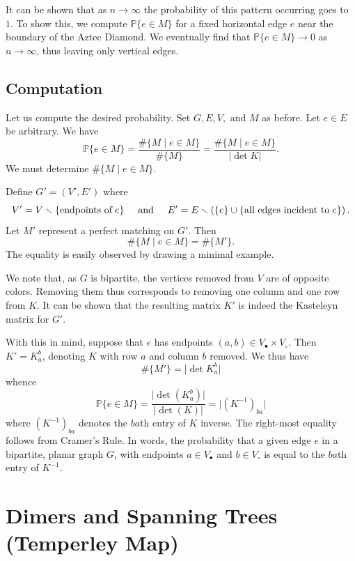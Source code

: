 \documentclass{article}
\begin{document}
It can be shown that as $n \rightarrow \infty$ the probability of this pattern occurring goes to $1$. To show this, we compute
$
\mathbb{P} \{ e \in M\}
$
for a fixed horizontal edge $e$ near the boundary of the Aztec Diamond. We eventually find that $\mathbb{P} \{ e \in M\} \rightarrow 0$ as $n \rightarrow \infty$, thus leaving only vertical edges. 

\subsection{Computation}

\hspace{1cm} Let us compute the desired probability. Set $G,E,V,$ and $M$ as before. Let $e \in E$ be arbitrary. We have
$$
\mathbb{P} \{ e \in M\} = \frac{\# \{M \mid e \in M\}}{\# \{ M\}} = \frac{\# \{M \mid e \in M\}}{\vert \det K \vert}.  
$$
We must determine $\# \{ M \mid e \in M\}$. 

Define $G' = (V', E')$ where
$$
V' = V \smallsetminus \{\text{endpoints of}\hspace{.1cm} e \}
\hspace{.5cm} \text{and} \hspace{.5cm}
 E' = E \smallsetminus \left(\{e\} \cup \{\text{all edges incident to}\hspace{.1cm} e \} \right).
 $$
 Let $M'$ represent a perfect matching on $G'$. Then 
 $$
 \# \{M \mid e \in M\} = \#\{M'\}. 
 $$
The equality is easily observed by drawing a minimal example. 

We note that, as $G$ is bipartite, the vertices removed from $V$ are of opposite colors. Removing them thus corresponds to removing one column and one row from $K$. It can be shown that the resulting matrix $K'$ is indeed the Kasteleyn matrix for $G'$. 

With this in mind, suppose that $e$ has endpoints $(a,b) \in V_\bullet \times V_\circ$. Then $K' = K^b_a$, denoting $K$ with row $a$ and column $b$ removed.  We thus have
$$
 \#\{M'\} = \vert \det K^b_a \vert 
$$
whence
$$
\mathbb{P}\{e \in M\} = \frac{\vert \det(K^b_a) \vert}{\vert \det(K)\vert} = \vert (K^{-1})_{ba}\vert
$$
where $(K^{-1})_{ba}$ denotes the $ba$th entry of $K$ inverse. The right-most equality follows from Cramer's Rule. In words, the probability that a given edge $e$ in a bipartite, planar graph $G$, with endpoints $a \in V_\bullet$ and $b \in V_\circ$ is equal to the $ba$th entry of $K^{-1}$. 


\newpage

\section{Dimers and Spanning Trees (Temperley Map)}
\end{document}
